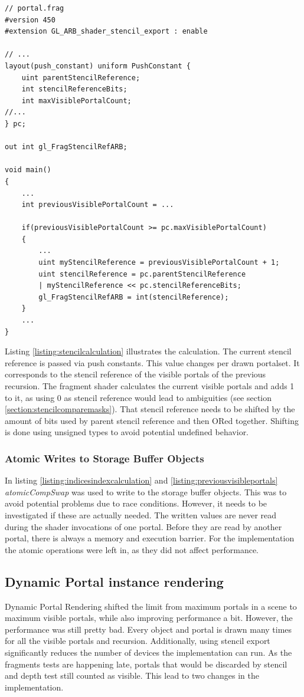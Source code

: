 \begin{lstlisting}[caption={Calculate Stencil Reference in Shader}, label=listing:stencilcalculation]
// portal.frag
#version 450
#extension GL_ARB_shader_stencil_export : enable

// ...
layout(push_constant) uniform PushConstant {	
	uint parentStencilReference;
	int stencilReferenceBits;
	int maxVisiblePortalCount;
//...
} pc;

out int gl_FragStencilRefARB;

void main()
{
	...
	int previousVisiblePortalCount = ...
	
	if(previousVisiblePortalCount >= pc.maxVisiblePortalCount)
	{
		...
		uint myStencilReference = previousVisiblePortalCount + 1;
		uint stencilReference = pc.parentStencilReference 
		| myStencilReference << pc.stencilReferenceBits;
		gl_FragStencilRefARB = int(stencilReference);
	}	
	...
}
\end{lstlisting}

Listing \ref{listing:stencilcalculation} illustrates the calculation. The current stencil reference is passed via push constants. This value changes per drawn \gls{portalset}. It corresponds to the stencil reference of the visible portals of the previous recursion. The fragment shader calculates the current visible portals and adds 1 to it, as using 0 as stencil reference would lead to ambiguities (see section \ref{section:stencilcomparemasks}). That stencil reference needs to be shifted by the amount of bits used by parent stencil reference and then ORed together. Shifting is done using unsigned types to avoid potential undefined behavior.

\subsubsection{Atomic Writes to Storage Buffer Objects}
In listing  \ref{listing:indicesindexcalculation} and \ref{listing:previousvisibleportals} \textit{atomicCompSwap} was used to write to the storage buffer objects. This was to avoid potential problems due to race conditions. However, it needs to be investigated if these are actually needed. The written values are never read during the shader invocations of one portal. Before they are read by another portal, there is always a memory and execution barrier. For the implementation the atomic operations were left in, as they did not affect performance.

\subsection{Dynamic Portal instance rendering}
\label{section:dynamicportalinstancerendering}
Dynamic Portal Rendering shifted the limit from maximum portals in a scene to maximum visible portals, while also improving performance a bit. However, the performance was still pretty bad. Every object and portal is drawn many times for all the visible portals and recursion. Additionally, using stencil export significantly reduces the number of devices the implementation can run. As the fragments tests are happening late, portals that would be discarded by stencil and depth test still counted as visible. This lead to two changes in the implementation.

